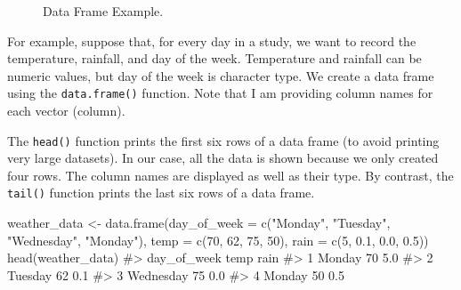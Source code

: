 \documentclass[
  letterpaper,
]{latex/krantz}
\makeatletter
\newenvironment{Shaded}{\begin{snugshade}}{\end{snugshade}}
\newcommand{\AttributeTok}[1]{\textcolor[rgb]{0.40,0.45,0.13}{#1}}
\newcommand{\CommentTok}[1]{\textcolor[rgb]{0.37,0.37,0.37}{#1}}
\newcommand{\DecValTok}[1]{\textcolor[rgb]{0.68,0.00,0.00}{#1}}
\newcommand{\FloatTok}[1]{\textcolor[rgb]{0.68,0.00,0.00}{#1}}
\newcommand{\FunctionTok}[1]{\textcolor[rgb]{0.28,0.35,0.67}{#1}}
\newcommand{\NormalTok}[1]{\textcolor[rgb]{0.00,0.23,0.31}{#1}}
\newcommand{\OtherTok}[1]{\textcolor[rgb]{0.00,0.23,0.31}{#1}}
\newcommand{\StringTok}[1]{\textcolor[rgb]{0.13,0.47,0.30}{#1}}
\newenvironment{kframe}{%
\medskip{}
\setlength{\fboxsep}{.8em}
 \def\at@end@of@kframe{}%
 \ifinner\ifhmode%
  \def\at@end@of@kframe{\end{minipage}}%
  \begin{minipage}{\columnwidth}%
 \fi\fi%
 \def\FrameCommand##1{\hskip\@totalleftmargin \hskip-\fboxsep
 \colorbox{shadecolor}{##1}\hskip-\fboxsep
     \hskip-\linewidth \hskip-\@totalleftmargin \hskip\columnwidth}%
 \MakeFramed {\advance\hsize-\width
   \@totalleftmargin\z@ \linewidth\hsize
   \@setminipage}}%
 {\par\unskip\endMakeFramed%
 \at@end@of@kframe}
\renewenvironment{Shaded}{\begin{kframe}}{\end{kframe}}
\makeatother
\begin{document}
\begin{figure}


\caption{\label{fig-dataframe}Data Frame Example.}

\end{figure}%

For example, suppose that, for every day in a study, we want to record
the temperature, rainfall, and day of the week. Temperature and rainfall
can be numeric values, but day of the week is character type. We create
a data frame using the
\texttt{data.frame()}
function. Note that I am providing column names for each vector
(column).

The \texttt{head()} function
prints the first six rows of a data frame (to avoid printing very large
datasets). In our case, all the data is shown because we only created
four rows. The column names are displayed as well as their type. By
contrast, the \texttt{tail()}
function prints the last six rows of a data frame.

\begin{Shaded}
\begin{Highlighting}[]
\NormalTok{weather\_data }\OtherTok{\textless{}{-}} \FunctionTok{data.frame}\NormalTok{(}\AttributeTok{day\_of\_week =} \FunctionTok{c}\NormalTok{(}\StringTok{"Monday"}\NormalTok{, }\StringTok{"Tuesday"}\NormalTok{,}
                                           \StringTok{"Wednesday"}\NormalTok{, }\StringTok{"Monday"}\NormalTok{), }
                           \AttributeTok{temp =} \FunctionTok{c}\NormalTok{(}\DecValTok{70}\NormalTok{, }\DecValTok{62}\NormalTok{, }\DecValTok{75}\NormalTok{, }\DecValTok{50}\NormalTok{), }
                           \AttributeTok{rain =} \FunctionTok{c}\NormalTok{(}\DecValTok{5}\NormalTok{, }\FloatTok{0.1}\NormalTok{, }\FloatTok{0.0}\NormalTok{, }\FloatTok{0.5}\NormalTok{))}
\FunctionTok{head}\NormalTok{(weather\_data)}
\CommentTok{\#\textgreater{}   day\_of\_week temp rain}
\CommentTok{\#\textgreater{} 1      Monday   70  5.0}
\CommentTok{\#\textgreater{} 2     Tuesday   62  0.1}
\CommentTok{\#\textgreater{} 3   Wednesday   75  0.0}
\CommentTok{\#\textgreater{} 4      Monday   50  0.5}
\end{Highlighting}
\end{Shaded}
\end{document}
